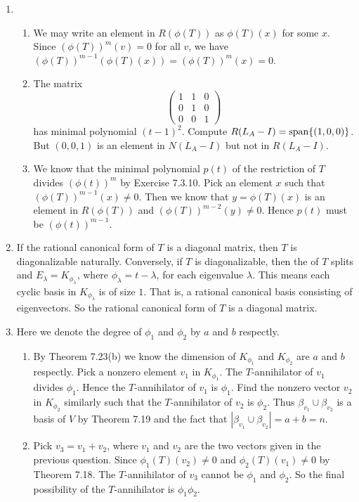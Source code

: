 \begin{enumerate}
\item \begin{enumerate}
\item We may write an element in $R(\phi(T))$ as $\phi(T)(x)$ for some $x$. Since $(\phi(T))^m(v)=0$ for all $v$, we have $(\phi(T))^{m-1}(\phi(T)(x))=(\phi(T))^m(x)=0$.
\item The matrix 
\[\begin{pmatrix}1&1&0\\0&1&0\\0&0&1\end{pmatrix}\]
has minimal polynomial $(t-1)^2$. Compute $R(L_A-I)=\sp\{(1,0,0)\}$. But $(0,0,1)$ is an element in $N(L_A-I)$ but not in $R(L_A-I)$.
\item We know that the minimal polynomial $p(t)$ of the restriction of $T$ divides $(\phi(t))^m$ by Exercise 7.3.10. Pick an element $x$ such that $(\phi(T))^{m-1}(x)\neq 0$. Then we know that $y=\phi(T)(x)$ is an element in $R(\phi(T))$ and $(\phi(T))^{m-2}(y)\neq 0$. Hence $p(t)$ must be $(\phi(t))^{m-1}$.
\end{enumerate}
\item If the rational canonical form of $T$ is a diagonal matrix, then $T$ is diagonalizable naturally. Conversely, if $T$ is diagonalizable, then the \charpoly{} of $T$ splits and $E_{\lambda}=K_{\phi_{\lambda}}$, where $\phi_{\lambda}=t-\lambda$, for each eigenvalue $\lambda$. This means each cyclic basis in $K_{\phi_{\lambda}}$ is of size $1$. That is, a rational canonical basis consisting of eigenvectors. So the rational canonical form of $T$ is a diagonal matrix.
\item Here we denote the degree of $\phi_1$ and $\phi_2$ by $a$ and $b$ respectly. \begin{enumerate}
\item By Theorem 7.23(b) we know the dimension of $K_{\phi_1}$ and $K_{\phi_2}$ are $a$ and $b$ respectly. Pick a nonzero element $v_1$ in $K_{\phi_1}$. The $T$-annihilator of $v_1$ divides $\phi_1$. Hence the $T$-annihilator of $v_1$ is $\phi_1$. Find the nonzero vector $v_2$ in $K_{\phi_2}$ similarly such that the $T$-annihilator of $v_2$ is $\phi_2$. Thus $\beta_{v_1}\cup \beta_{v_2}$ is a basis of $V$ by Theorem 7.19 and the fact that $|\beta_{v_1}\cup \beta_{v_2}|=a+b=n$.
\item Pick $v_3=v_1+v_2$, where $v_1$ and $v_2$ are the two vectors given in the previous question. Since $\phi_1(T)(v_2)\neq 0$ and $\phi_2(T)(v_1)\neq 0$ by Theorem 7.18. The $T$-annihilator of $v_3$ cannot be $\phi_1$ and $\phi_2$. So the final possibility of the $T$-annihilator is $\phi_1\phi_2$.

\end{enumerate}
\end{enumerate}
